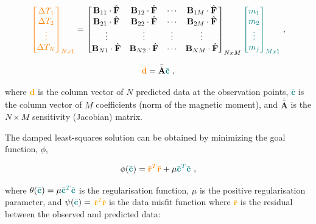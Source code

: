 \begin{equation}
\textcolor{orange}{\begin{bmatrix}
    \Delta T_1 \\ \Delta T_2 \\ \vdots \\ \Delta T_N
\end{bmatrix}_{Nx1}} = \begin{bmatrix}
    \mathbf{B}_{11} \cdot \hat{\mathbf{F}} & \mathbf{B}_{12} \cdot \hat{\mathbf{F}} & \cdots & \mathbf{B}_{1M} \cdot \hat{\mathbf{F}} \\
    \mathbf{B}_{21} \cdot \hat{\mathbf{F}} & \mathbf{B}_{22} \cdot \hat{\mathbf{F}} & \cdots & \mathbf{B}_{2M} \cdot \hat{\mathbf{F}} \\
    \vdots & \vdots & \vdots & \vdots \\
    \mathbf{B}_{N1} \cdot \hat{\mathbf{F}} & \mathbf{B}_{N2} \cdot \hat{\mathbf{F}} & \cdots & \mathbf{B}_{NM} \cdot \hat{\mathbf{F}} \\
\end{bmatrix}_{NxM} \textcolor{teal}{\begin{bmatrix}
    m_1 \\ m_2 \\ \vdots \\ m_j
\end{bmatrix}_{Mx1}} \ ,
\end{equation}

\begin{equation}
    \textcolor{orange}{\bar{\mathbf{d}}} = \bar{\bar{\mathbf{A}}} \textcolor{teal}{\bar{\mathbf{c}}}
    \ ,
\end{equation}

\noindent
where \textcolor{orange}{$\bar{\mathbf{d}}$} is the column vector of $N$ predicted data at the observation points, \textcolor{teal}{$\bar{\mathbf{c}}$} is the column vector of $M$ coefficients (norm of the magnetic moment), and $\bar{\bar{\mathbf{A}}}$ is the $N \times M$ sensitivity (Jacobian) matrix. 


The damped least-squares solution can be obtained by minimizing the goal function, $\phi$, 

\begin{equation}
\label{eq:goal_function}
    \phi(\textcolor{teal}{\bar{\mathbf{c}}}) = \textcolor{orange}{\bar{\mathbf{r}}^T\bar{\mathbf{r}}} + \mu \textcolor{teal}{\bar{\mathbf{c}}^T\bar{\mathbf{c}}}
    \ ,
\end{equation}

\noindent
where $\theta(\textcolor{teal}{\bar{\mathbf{c}}}) = \mu \textcolor{teal}{\bar{\mathbf{c}}^T\bar{\mathbf{c}}}$ is the regularisation function, $\mu$ is the positive regularisation parameter, and $\psi(\textcolor{teal}{\bar{\mathbf{c}}}) =$ \textcolor{orange}{$\bar{\mathbf{r}}^T\bar{\mathbf{r}}$} is the data misfit function where \textcolor{orange}{$\bar{\mathbf{r}}$} is the residual between the observed and predicted data:

